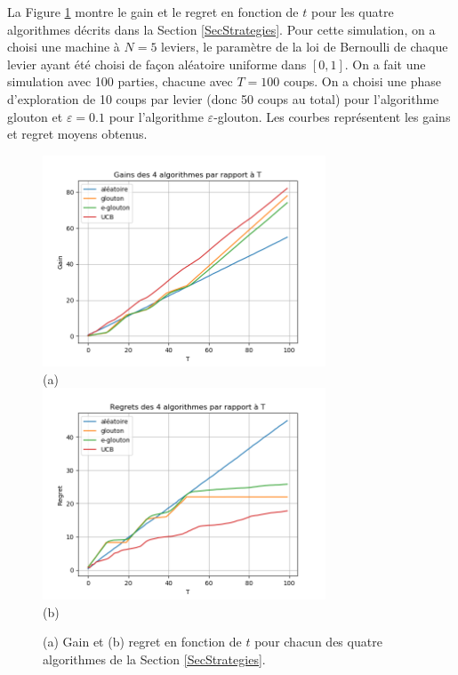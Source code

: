 \documentclass[a4paper,12pt]{article}
\begin{document}
La Figure \ref{FigResultsTemps} montre le gain et le regret en fonction de $t$ pour les quatre algorithmes décrits dans la Section \ref{SecStrategies}. Pour cette simulation, on a choisi une machine à $N = 5$ leviers, le paramètre de la loi de Bernoulli de chaque levier ayant été choisi de façon aléatoire uniforme dans $[0, 1]$. On a fait une simulation avec 100 parties, chacune avec $T = 100$ coups. On a choisi une phase d'exploration de 10 coups par levier (donc 50 coups au total) pour l'algorithme glouton et $\varepsilon = 0.1$ pour l'algorithme $\varepsilon$-glouton. Les courbes représentent les gains et regret moyens obtenus.

\begin{figure}[ht]
\centering
\includegraphics[width=0.75\textwidth]{Gain_T} \\
(a) \\
\includegraphics[width=0.75\textwidth]{Regret_T} \\
(b)
\caption{(a) Gain et (b) regret en fonction de $t$ pour chacun des quatre algorithmes de la Section \ref{SecStrategies}.}
\label{FigResultsTemps}
\end{figure}
\end{document}
